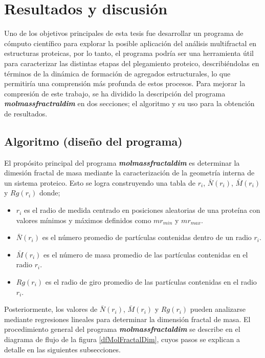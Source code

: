 \chapter{Resultados y discusión}

Uno de los objetivos principales de esta tesis fue desarrollar un programa de cómputo científico para explorar la posible aplicación del análisis multifractal en estructuras proteicas, por lo tanto, el programa podría ser una herramienta útil para caracterizar las distintas etapas del plegamiento proteico, describiéndolas en términos de la dinámica de formación de agregados estructurales, lo que permitiría una comprensión más profunda de estos procesos. Para mejorar la compresión de este trabajo, se ha dividido la descripción del programa \textit{\textbf{molmassfractraldim}} en dos secciones; el algoritmo y su uso para la obtención de resultados. 
 
 
\section{Algoritmo (diseño del programa)}

El propósito principal del programa \textbf{\textit{molmassfractaldim}} es determinar la dimesi\'{o}n fractal de masa mediante la caracterizaci\'{o}n de la geometría interna de un sistema proteico. Esto se logra construyendo una tabla de \(r_i\), \( \bar{N}(r_i)\), \( \bar{M}(r_i)\) y  \( {Rg}(r_i)\) donde;

\begin{itemize}
	\item \(r_i\) es el radio de medida centrado en posiciones aleatorias de una prote\'{i}na con valores m\'{i}nimos y m\'{a}ximos definidos como \(mr_{min}\) y \(mr_{max}\).
	\item \(\bar{N}(r_i)\) es el número promedio de partículas contenidas dentro de un radio \(r_i\). 
	\item  \(\bar{M}(r_i)\) es el n\'{u}mero de masa promedio de las part\'{i}culas contenidas en el radio \(r_i\).
	\item  \({Rg}(r_i)\) es el radio de giro promedio de las part\'{i}culas contenidas en el radio \(r_i\).
\end{itemize}

Posteriormente, los valores de \( \bar{N}(r_i) \), \( \bar{M}(r_i)\) y \({Rg}(r_i)\) pueden analizarse mediante regresiones lineales para determinar la dimensi\'{o}n fractal de masa. El procedimiento general del programa \textbf{\textit{molmassfractaldim}} se describe en el diagrama de flujo de la figura \ref{dfMolFractalDim}, cuyos pasos se explican a detalle en las siguientes subsecciones.
 
